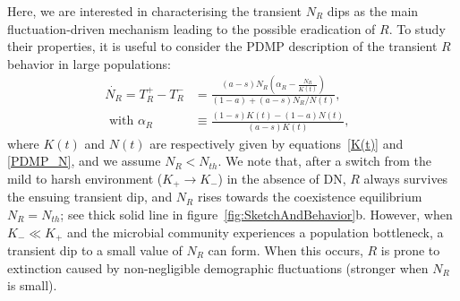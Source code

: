 \documentclass{article}
\begin{document}
Here, we are interested in characterising the transient $N_R$ dips as the main fluctuation-driven mechanism leading to the possible eradication of $R$. To study their properties, it is useful to consider the PDMP description of the transient $R$ behavior in large populations:
\begin{equation}
\begin{aligned}
    \dot{N_R}=T^+_{R}-T^-_{R}&=\frac{\left(a-s\right)N_R(\alpha_R-\frac{N_R}{K(t)})}{\left(1-a\right)+\left(a-s\right)N_R/N(t)},&\\
    \text{ with }\alpha_R&\equiv\frac{(1-s)K(t)-(1-a)N(t)}{(a-s)K(t)},&
\end{aligned}
\label{det_eq_Nc}
\end{equation}
where \(K(t)\) and \(N(t)\) are respectively given by equations~\eqref{K(t)} and \eqref{PDMP_N}, and we assume \(N_R<N_{th}\). We note that, after a switch from the mild to harsh environment (\(K_+\rightarrow K_-\)) in the absence of DN, $R$ always survives the ensuing transient dip, and $N_R$ rises towards the coexistence equilibrium \(N_R=N_{th}\); see thick solid line in figure~\ref{fig:SketchAndBehavior}b. However, when \(K_-\ll K_+\) and the microbial community experiences a population bottleneck, a transient dip to a small value of  \(N_R\) can form. When this occurs, $R$ is prone to extinction caused by non-negligible demographic fluctuations (stronger when \(N_R\) is small).
 
\end{document}
